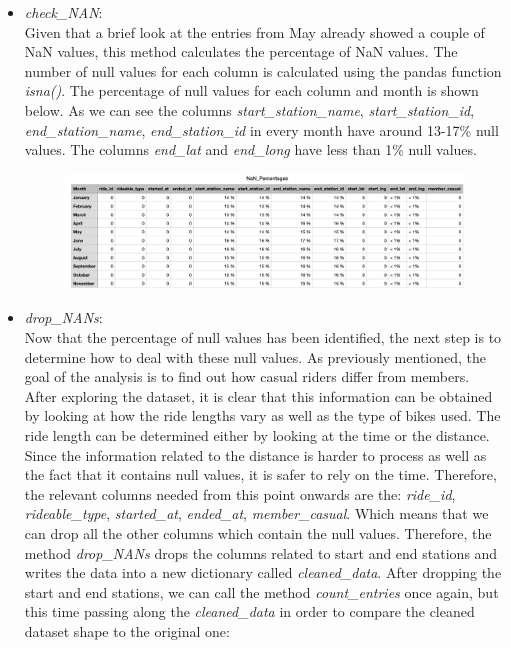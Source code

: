 \documentclass[12pt]{article}
\begin{document}
\begin{itemize}
	\item \textit{check\_NAN}:\\
	Given that a brief look at the entries from May already showed a couple of NaN values, this method calculates the percentage of NaN values. The number of null values for each column is calculated using the pandas function \textit{isna()}. The percentage of null values for each column and month is shown below. As we can see the columns \textit{start\_station\_name}, \textit{start\_station\_id}, \textit{end\_station\_name}, \textit{end\_station\_id} in every month have around 13-17\% null values. The columns \textit{end\_lat} and \textit{end\_long} have less than 1\% null values. 
	\begin{figure}[ht]
	\includegraphics[width=6.5 in, height = 2 in]{imgNAN.png}
	\end{figure}
	
	\item \textit{drop\_NANs}:\\
	Now that the percentage of null values has been identified, the next step is to determine how to deal with these null values. As previously mentioned, the goal of the analysis is to find out how casual riders differ from members. After exploring the dataset, it is clear that this information can be obtained by looking at how the ride lengths vary as well as the type of bikes used. The ride length can be determined either by looking at the time or the distance. Since the information related to the distance is harder to process as well as the fact that it contains null values, it is safer to rely on the time. Therefore, the relevant columns needed from this point onwards are the: \textit{ride\_id}, \textit{rideable\_type}, \textit{started\_at}, \textit{ended\_at}, \textit{member\_casual}. Which means that we can drop all the other columns which contain the null values. Therefore, the method \textit{drop\_NANs} drops the columns related to start and end stations and writes the data into a new dictionary called \textit{cleaned\_data}. After dropping the start and end stations, we can call the method \textit{count\_entries} once again, but this time passing along the \textit{cleaned\_data} in order to compare the cleaned dataset shape to the original one:
	

\end{itemize}
\end{document}
